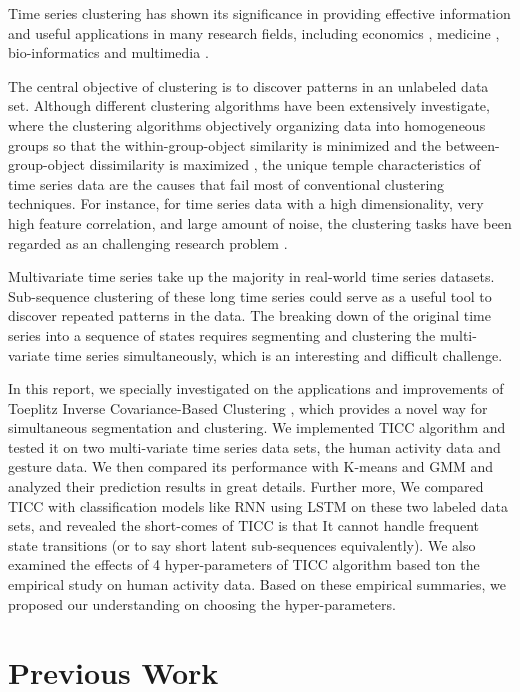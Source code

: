\documentclass{llncs}
\begin{document}
Time series clustering has shown its significance in providing effective information and useful applications in many research fields, including economics \cite{DEMETRIADES1996387}, medicine \cite{DBLP:conf/smc/TsujinoO10}, bio-informatics \cite{DBLP:journals/bmcbi/WangJLZWWHZJXW17} and multimedia \cite{DBLP:conf/mue/NiennattrakulR07}. 

The central objective of clustering is to discover patterns in an unlabeled data set. Although different clustering algorithms have been extensively investigate, where the clustering algorithms objectively organizing data into homogeneous groups so that the within-group-object similarity is minimized and the between-group-object dissimilarity is maximized \cite{DBLP:journals/pr/Liao05}, the unique temple characteristics of time series data are the causes that fail most of conventional clustering techniques. For instance, for time series data with a high dimensionality, very high feature correlation, and large amount of noise, the clustering tasks have been regarded as an challenging research problem \cite{DBLP:journals/is/AghabozorgiST15}.

Multivariate time series take up the majority in real-world time series datasets. Sub-sequence clustering of these long time series could serve as a useful tool to discover repeated patterns in the data. The breaking down of the original time series into a sequence of states requires segmenting and clustering the multi-variate time series simultaneously, which is an interesting and difficult challenge. 

In this report, we specially investigated on the applications and improvements of Toeplitz Inverse Covariance-Based Clustering \cite{tiic}, which provides a novel way for simultaneous segmentation and clustering. We implemented TICC algorithm and tested it on two multi-variate time series data sets, the human activity data and gesture data. We then compared its performance with K-means and GMM and analyzed their prediction results in great details. Further more, We compared TICC with classification models like RNN using LSTM on these two labeled data sets, and revealed the short-comes of TICC is that It cannot handle frequent state transitions (or to say short latent sub-sequences equivalently). We also examined the effects of 4 hyper-parameters of TICC algorithm based ton the empirical study on human activity data. Based on these empirical summaries, we proposed our understanding on choosing the hyper-parameters.

\section{Previous Work}
\end{document}
